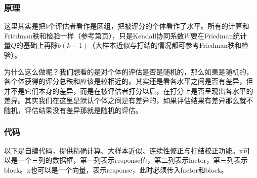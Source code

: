\subsubsection{原理}
这里其实是把$b$个评估者看作是区组，把被评分的个体看作了水平。所有的计算和Friedman秩和检验一样（参考第\pageref{sec:friedman检验原理}页），只是Kendall协同系数$W$要在Friedman统计量$Q$的基础上再除$b(k-1)$（大样本近似与打结的情况都可参考Friedman秩和检验）。\par
为什么这么做呢？我们想看的是对个体的评估是否是随机的，那么如果是随机的，各个体获得的评分总秩和应该是较相近的。其实还是看各水平之间是否有差异，但并不是它们本身的差异，而是在被评估者打分以后，在打分上是否呈现出各水平的差异。其实我们在这里是默认个体之间是有差异的，如果评估结果有差异那么就不随机，评估结果没有差异那就是随机的评估。
\subsubsection{代码}
以下是自编代码，提供精确计算、大样本近似、连续性修正与打结校正功能。x可以是一个三列的数据框，第一列表示response值，第二列表示factor，第三列表示block。x也可以是一个向量，表示response，此时必须传入factor和block。
\inputminted[bgcolor=white, linenos, frame=single, numbersep=5pt, breaklines]{r}{nonparametric-statistics/chapter4/kendall.R}